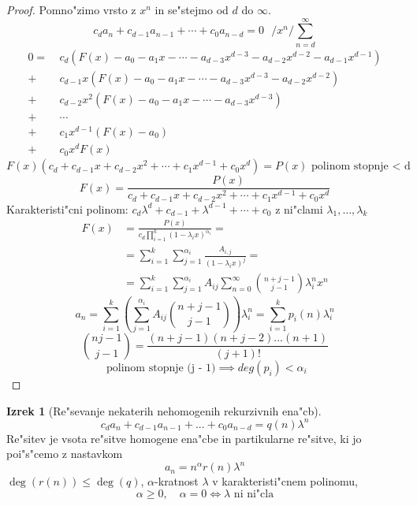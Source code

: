 \documentclass[a4paper,12pt]{article}
\theoremstyle{definition}
\newtheorem{theorem}[counter]{Izrek}
\theoremstyle{remark}
\begin{document}
\begin{proof}
	Pomno"zimo vrsto z $x^n$ in se"stejmo od $d$ do $\infty$.
    \[c_d a_n + c_{d - 1} a_{n - 1} + \cdots + c_0 a_{n - d} = 0 \ \ \ / x^n / \sum_{n = d}^{\infty}\]
    \begin{align*}
        0 = \ & c_d(F(x) - a_0 - a_1x - \cdots - a_{d - 3}x^{d - 3} - a_{d - 2}x^{d - 2} - a_{d - 1}x^{d - 1})\\
        +\ & c_{d - 1} x (F(x) - a_0 - a_1x - \cdots - a_{d - 3}x^{d - 3} - a_{d - 2}x^{d - 2})\\
        +\ & c_{d - 2} x^2 (F(x) - a_0 - a_1x - \cdots - a_{d - 3}x^{d - 3})\\
        +\ & \cdots \\
        +\ & c_1 x^{d - 1} (F(x) - a_0) \\
        +\ & c_0 x^d F(x)
    \end{align*}
    \[F(x) (c_d + c_{d - 1} x + c_{d - 2} x^2 + \cdots + c_1 x^{d - 1} + c_0 x^d) = P(x) \text{ polinom stopnje < d}\]
    \[F(x) = \frac{P(x)}{c_d + c_{d - 1} x + c_{d - 2} x^2 + \cdots + c_1 x^{d - 1} + c_0 x^d}\]
    Karakteristi"cni polinom: $c_d \lambda^d + c_{d - 1} + \lambda^{d - 1} + \cdots + c_0$ z ni"clami $\lambda_1, \ldots, \lambda_k$
    \begin{align*}
        F(x) & = \frac{P(x)}{c_d \prod_{i = 1}^k (1 - \lambda_i x)^{\alpha_i}} = \\
        & = \sum_{i = 1}^k \sum_{j = 1}^{\alpha_i} \frac{A_{i, j}}{(1 - \lambda_i x)^j} = \\
        & = \sum_{i = 1}^k \sum_{j = 1}^{\alpha_i} A_{i j} \sum_{n = 0}^{\infty} \binom{n + j - 1}{j - 1} \lambda_i^n x^n
    \end{align*}
    \[a_n = \sum_{i = 1}^k (\sum_{j = 1}^{\alpha_i} A_{i j} \binom{n + j - 1}{j - 1})\lambda_i^n = \sum_{i = 1}^k p_i(n)\lambda_i^n\]
    \[\binom{n  j - 1}{j - 1} = \frac{(n + j - 1)(n + j - 2) ... (n + 1)}{(j + 1)!}\]
    \[\text{ polinom stopnje (j - 1)} \implies deg(p_i) < \alpha_i\]
\end{proof}

\begin{theorem}[Re"sevanje nekaterih nehomogenih rekurzivnih ena"cb]
    \[c_d a_n + c_{d - 1} a_{n - 1} + ... + c_0 a_{n - d} = q(n) \lambda^n\]
    Re"sitev je vsota re"sitve homogene ena"cbe in partikularne re"sitve, ki jo poi"s"cemo z nastavkom
    \[a_n = n^{\alpha} r(n) \lambda^n\]
    $\deg(r(n)) \leqslant \deg(q)$, $\alpha$-kratnost $\lambda$ v karakteristi"cnem polinomu, 
    \[\alpha \geqslant 0, \quad \alpha = 0 \iff \lambda \text{ ni ni"cla}\]
\end{theorem}
\end{document}
